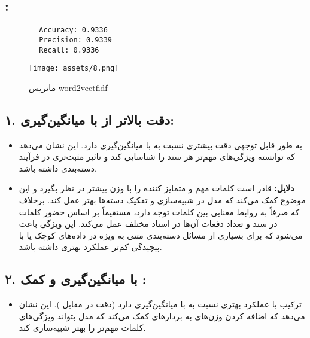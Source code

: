 \documentclass[a4paper,12pt]{article}
\begin{document}
	
	
\subsection*{:}

\begin{latin}
	\begin{verbatim}
		Accuracy: 0.9336
		Precision: 0.9339
		Recall: 0.9336
	\end{verbatim}
\end{latin}


\begin{figure}[H]
	\centering
	\texttt{[image: assets/8.png]}
	\caption{\textcolor{CustomAccent}{ماتریس word2vectfidf}}
\end{figure}


\subsection*{۱. دقت  بالاتر از  با میانگین‌گیری:}

\begin{itemize}[label=\textbullet]
	\item {} به طور قابل توجهی دقت بیشتری نسبت به 
	 با میانگین‌گیری  دارد. این نشان می‌دهد که 
	 توانسته ویژگی‌های مهم‌تر هر سند را شناسایی کند و تاثیر 
	مثبت‌تری در فرآیند دسته‌بندی داشته باشد.
\end{itemize}

\begin{itemize}[label=\textbullet]
	\item \textbf{دلایل:}
	 قادر است کلمات مهم و متمایز کننده را با وزن بیشتر در نظر 
	بگیرد و این موضوع کمک می‌کند که مدل در شبیه‌سازی و تفکیک 
	دسته‌ها بهتر عمل کند. برخلاف  که صرفاً به روابط معنایی 
	بین کلمات توجه دارد،  مستقیماً بر اساس حضور کلمات در سند
و تعداد دفعات آن‌ها در اسناد مختلف عمل می‌کند. این ویژگی باعث 
می‌شود که  برای بسیاری از مسائل دسته‌بندی متنی به ویژه در 
داده‌های کوچک یا با پیچیدگی کم‌تر عملکرد بهتری داشته باشد.
\end{itemize}


\subsection*{۲.  با میانگین‌گیری و کمک :}

\begin{itemize}[label=\textbullet]
	\item ترکیب  با  عملکرد بهتری نسبت به 
	 با میانگین‌گیری دارد (دقت
	 در مقابل 
	).
	 این نشان می‌دهد که اضافه کردن وزن‌های  به 
	بردارهای  کمک می‌کند که مدل بتواند ویژگی‌های 
	کلمات مهم‌تر را بهتر شبیه‌سازی کند.
\end{itemize}
\end{document}
